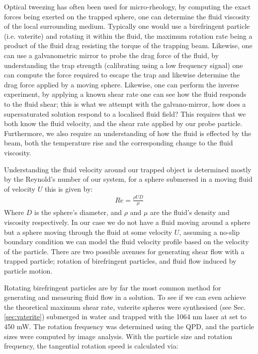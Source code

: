 Optical tweezing has often been used for micro-rheology, by computing the exact forces being exerted on the trapped sphere, one can determine the fluid viscosity of the local surrounding medium. Typically one would use a birefringent particle (i.e. vaterite) and rotating it within the fluid, the maximum rotation rate being a product of the fluid drag resisting the torque of the trapping beam. Likewise, one can use a galvanometric mirror to probe the drag force of the fluid, by understanding the trap strength (calibrating using a low frequency signal) one can compute the force required to escape the trap and likewise determine the drag force applied by a moving sphere. Likewise, one can perform the inverse experiment, by applying a known shear rate one can see how the fluid responds to the fluid shear; this is what we attempt with the galvano-mirror, how does a supersaturated solution respond to a localised fluid field? This requires that we both know the fluid velocity, and the shear rate applied by our probe particle. Furthermore, we also require an understanding of how the fluid is effected by the beam, both the temperature rise and the corresponding change to the fluid viscosity. 

Understanding the fluid velocity around our trapped object is determined mostly by the Reynold's number of our system, for a sphere submersed in a moving fluid of velocity $U$ this is given by:
\begin{align}
	Re = \frac{\rho UD}{\mu}
\end{align}
Where $D$ is the sphere's diameter, and $\rho$ and $\mu$ are the fluid's density and viscosity respectively. In our case we do not have a fluid moving around a sphere but a sphere moving through the fluid at some velocity $U$, assuming a no-slip boundary condition we can model the fluid velocity profile based on the velocity of the particle. There are two possible avenues for generating shear flow with a trapped particle; rotation of birefringent particles, and fluid flow induced by particle motion. 

Rotating birefringent particles are by far the most common method for generating and measuring fluid flow in a solution. To see if we can even achieve the theoretical maximum shear rate, vaterite spheres were synthesised (see Sec.\ref{sec:vaterite}) submerged in water and trapped with the 1064 nm laser at set to 450 mW. The rotation frequency was determined using the QPD, and the particle sizes were computed by image analysis. With the particle size and rotation frequency, the tangential rotation speed is calculated via:

